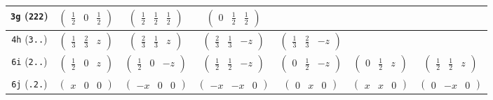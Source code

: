 \documentclass[fleqn,9pt,landscape]{jsarticle}
\begin{document}
\begin{center}
\begin{longtable}{ccccccc}
{\tt 3g} ({\tt 222}) & $ \begin{pmatrix} \frac{1}{2} & 0 & \frac{1}{2} \end{pmatrix} $ & $ \begin{pmatrix} \frac{1}{2} & \frac{1}{2} & \frac{1}{2} \end{pmatrix} $ & $ \begin{pmatrix} 0 & \frac{1}{2} & \frac{1}{2} \end{pmatrix} $ & $  $ & $  $ & $  $ \\ \hline
{\tt 4h} ({\tt 3..}) & $ \begin{pmatrix} \frac{1}{3} & \frac{2}{3} & z \end{pmatrix} $ & $ \begin{pmatrix} \frac{2}{3} & \frac{1}{3} & z \end{pmatrix} $ & $ \begin{pmatrix} \frac{2}{3} & \frac{1}{3} & - z \end{pmatrix} $ & $ \begin{pmatrix} \frac{1}{3} & \frac{2}{3} & - z \end{pmatrix} $ & $  $ & $  $ \\ \hline
{\tt 6i} ({\tt 2..}) & $ \begin{pmatrix} \frac{1}{2} & 0 & z \end{pmatrix} $ & $ \begin{pmatrix} \frac{1}{2} & 0 & - z \end{pmatrix} $ & $ \begin{pmatrix} \frac{1}{2} & \frac{1}{2} & - z \end{pmatrix} $ & $ \begin{pmatrix} 0 & \frac{1}{2} & - z \end{pmatrix} $ & $ \begin{pmatrix} 0 & \frac{1}{2} & z \end{pmatrix} $ & $ \begin{pmatrix} \frac{1}{2} & \frac{1}{2} & z \end{pmatrix} $ \\ \hline
{\tt 6j} ({\tt .2.}) & $ \begin{pmatrix} x & 0 & 0 \end{pmatrix} $ & $ \begin{pmatrix} - x & 0 & 0 \end{pmatrix} $ & $ \begin{pmatrix} - x & - x & 0 \end{pmatrix} $ & $ \begin{pmatrix} 0 & x & 0 \end{pmatrix} $ & $ \begin{pmatrix} x & x & 0 \end{pmatrix} $ & $ \begin{pmatrix} 0 & - x & 0 \end{pmatrix} $ \\ \hline

\end{longtable}
\end{center}
\end{document}
